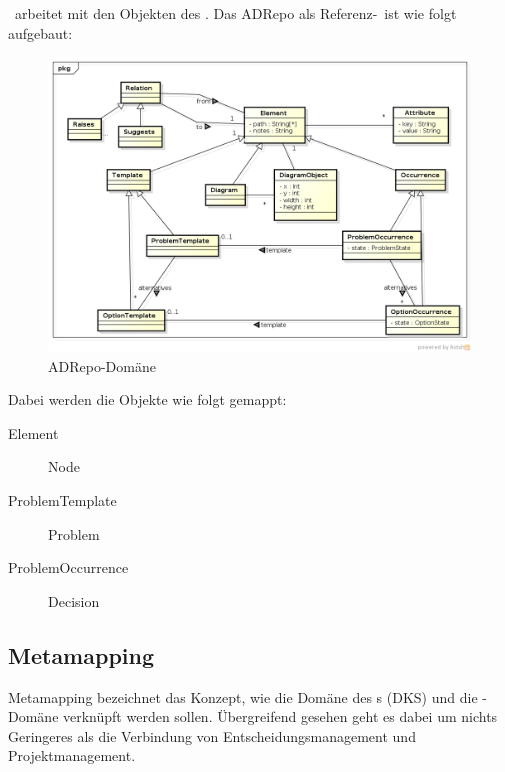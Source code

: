 			\eeppi\ arbeitet mit den Objekten des \dks. Das ADRepo als Referenz-\dks\ ist wie folgt aufgebaut:
			\begin{figure}[H]
				\includegraphics[width=\linewidth]{architecture/media/img/dksDomain.png}
				\centering
				\caption[DKS Domäne\newline 
				]{ADRepo-Domäne} %
				\label{fig:dksDomain}
			\end{figure}
			
			Dabei werden die Objekte wie folgt gemappt:
			\begin{description}
				\item[Element] Node
				\item[ProblemTemplate] Problem
				\item[ProblemOccurrence] Decision			
			\end{description}
			
			
		\subsection{Metamapping}
			Metamapping bezeichnet das Konzept, 
			wie die Domäne des \dks s (DKS) und die \eeppi -Domäne verknüpft werden sollen.
			Übergreifend gesehen geht es dabei um nichts Geringeres als die Verbindung von Entscheidungsmanagement und Projektmanagement.			
		
